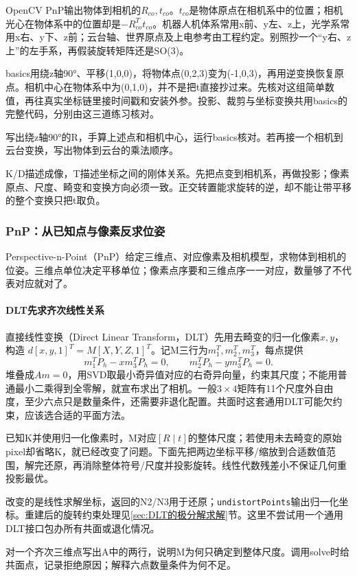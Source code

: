OpenCV PnP输出物体到相机的$R_{co},t_{co}$。$t_{co}$是物体原点在相机系中的位置；相机光心在物体系中的位置却是$-R_{co}^Tt_{co}$。机器人机体系常用x前、y左、z上，光学系常用x右、y下、z前；云台轴、世界原点及上电参考由工程约定。别照抄一个“y右、z上”的左手系，再假装旋转矩阵还是SO(3)。

\begin{example}[给变换加上反向核对]
basics用绕z轴90°、平移(1,0,0)，将物体点(0,2,3)变为(-1,0,3)，再用逆变换恢复原点。相机中心在物体系中为(0,1,0)，并不是把t直接抄过来。先核对这组简单数值，再往真实坐标链里接时间戳和安装外参。投影、裁剪与坐标变换共用basics的完整代码，分别由这三道练习核对。
\end{example}
\begin{exercise}\label{ex:v2-ba-transform}
写出绕z轴90°的R，手算上述点和相机中心，运行basics核对。若再接一个相机到云台变换，写出物体到云台的乘法顺序。
\end{exercise}
\begin{conclusion}
K/D描述成像，T描述坐标之间的刚体关系。先把点变到相机系，再做投影；像素原点、尺度、畸变和变换方向必须一致。正交转置能求旋转的逆，却不能让带平移的整个变换只把t取负。
\end{conclusion}

\subsubsection{PnP：从已知点与像素反求位姿}
Perspective-n-Point（PnP）给定三维点、对应像素及相机模型，求物体到相机的位姿。三维点单位决定平移单位；像素点序要和三维点序一一对应，数量够了不代表对应就对了。

\paragraph*{DLT先求齐次线性关系}
直接线性变换（Direct Linear Transform，DLT）先用去畸变的归一化像素$x,y$，构造 $d[x,y,1]^T=M[X,Y,Z,1]^T$。记M三行为$m_1^T,m_2^T,m_3^T$，每点提供
\[
m_1^TP_h-xm_3^TP_h=0,\qquad
m_2^TP_h-ym_3^TP_h=0.
\]
堆叠成$Am=0$，用SVD取最小奇异值对应的右奇异向量，约束其尺度；不能用普通最小二乘得到全零解，就宣布求出了相机。一般$3\times4$矩阵有11个尺度外自由度，至少六点只是数量条件，还需要非退化配置。共面时这套通用DLT可能欠约束，应该选合适的平面方法。

已知K并使用归一化像素时，M对应$[R\mid t]$的整体尺度；若使用未去畸变的原始pixel却省略K，就已经改变了问题。下面先把两边坐标平移/缩放到合适数值范围，解完还原，再消除整体符号/尺度并投影旋转。线性代数残差小不保证几何重投影最优。
\begin{example}[把DLT完整写出来]

改变的是线性求解坐标，返回的N2/N3用于还原；\texttt{undistortPoints}输出归一化坐标。重建后的旋转约束处理见\ref{sec:DLT的极分解求解}节。这里不尝试用一个通用DLT接口包办所有共面或退化情况。
\end{example}
\begin{exercise}\label{ex:v2-ba-dlt}
对一个齐次三维点写出A中的两行，说明M为何只确定到整体尺度。调用solve时给共面点，记录拒绝原因；解释六点数量条件为何不足。
\end{exercise}

